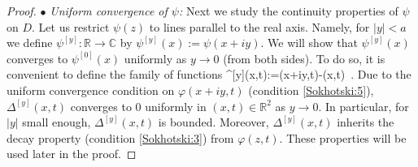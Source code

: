 \documentclass[12pt]{article}
\theoremstyle{plain}
\theoremstyle{definition}
\numberwithin{equation}{section}
\numberwithin{theorem}{section}
\def\be#1\ee{\begin{equation}#1\end{equation}}
\begin{document}
\begin{proof}
\medskip

\noindent
$\bullet$
{\em Uniform convergence of $\psi$:}
Next we study the continuity properties of $\psi$ on $D$.
Let us restrict $\psi(z)$ to lines parallel to the real axis. Namely, for $|y|<a$ we define $\psi^{[y]}:\mathbb{R}\rightarrow\mathbb{C}$ by 
$\psi^{[y]}(x):=\psi(x+iy)$. 
We will show that $\psi^{[y]}(x)$ converges to ${\psi^{[0]}(x)}$ uniformly as $y\rightarrow 0$ (from both sides). To do so, it is convenient to define the family of functions 
\be
\Delta^{[y]}(x,t):=\varphi(x+iy,t)-\varphi(x,t)\ .
\ee
 Due to the uniform convergence condition on $\varphi(x+iy,t)$ (condition \ref{Sokhotski:5}), $\Delta^{[y]}(x,t)$ converges to 0 uniformly in 
	$(x,t) \in \mathbb{R}^2$
 as $y\rightarrow 0$. In particular, for $|y|$ small enough, $\Delta^{[y]}(x,t)$ is bounded. 
 Moreover, $\Delta^{[y]}(x,t)$ inherits the decay property (condition \ref{Sokhotski:3}) 
 from $\varphi(z,t)$. These properties will be used later in the proof.
 

\end{proof}
\end{document}
